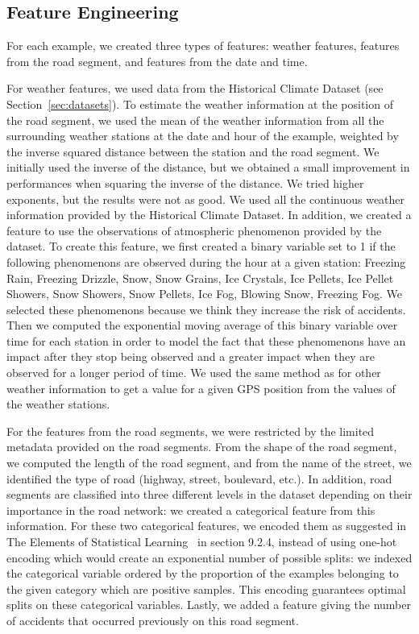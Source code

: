 \documentclass[conference]{IEEEtran}
\begin{document}
\subsection{Feature Engineering}

For each example, we created three types of features: weather features,
features from the road segment, and features from the date and time.

For weather features, we used data from the Historical Climate Dataset (see Section~\ref{sec:datasets}).
To estimate the weather information at the position of the road
segment, we used the mean of the weather information from all the
surrounding weather stations at the date and hour of the example, weighted
by the inverse squared distance between the station and the
road segment. We initially used the inverse of the distance, but we
obtained a small improvement in performances when squaring the inverse of
the distance. We tried higher exponents, but the results were not as good.
We used all the continuous weather information provided
by the Historical Climate Dataset. In addition, we created a feature to use
the observations of atmospheric phenomenon provided by the dataset.
To create this feature, we first created a binary variable set to 1 if the
following phenomenons are observed during the hour at a given station:
Freezing Rain, Freezing Drizzle, Snow, Snow Grains, Ice Crystals, Ice Pellets,
Ice Pellet Showers, Snow Showers, Snow Pellets, Ice Fog, Blowing Snow, Freezing
Fog. We selected these phenomenons because we think they increase the risk of
accidents. Then we computed the exponential moving average of this binary
variable over time for each station in order to model the fact that
these phenomenons have an impact after they stop being observed and a greater
impact when they are observed for a longer period of time.
We used the same method as for other weather information to get a value for a given 
GPS position from the values of the weather stations.

For the features from the road segments, we were restricted by the limited
metadata provided on the road segments. From the shape of the road segment,
we computed the length of the road segment, and from the name of the
street, we identified the type of road (highway, street, boulevard, etc.).
In addition, road segments are classified into three different levels in
the dataset depending on their importance in the road network: we created a
categorical feature from this information. For these two categorical
features, we encoded them as suggested in The Elements of Statistical
Learning~\cite{elementsofstat} in section 9.2.4, instead of using one-hot
encoding which would create an exponential number of possible splits: we indexed the
categorical variable ordered by the proportion of the examples belonging to
the given category which are positive samples. This encoding guarantees 
optimal splits on these categorical variables. Lastly, we added a
feature giving the number of accidents that occurred previously on this
road segment.
\end{document}
